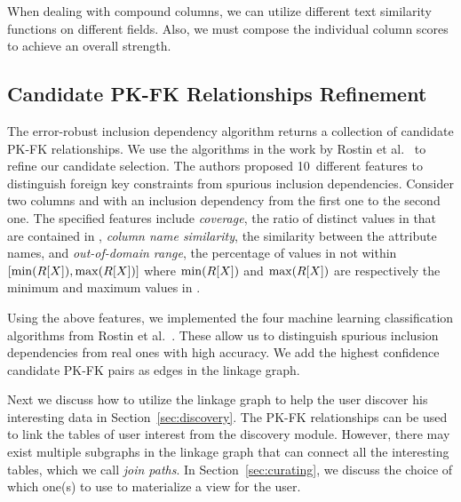 When dealing with compound columns, we can utilize different text similarity functions on different fields. 
Also, we must compose the individual column scores to achieve an overall strength.


\subsection{Candidate PK-FK Relationships Refinement}
\label{subsec:refine}


The error-robust inclusion dependency algorithm returns a collection of candidate PK-FK relationships.
We use the algorithms in the work by Rostin et al.~\cite{DBLP:conf/webdb/RostinABNL09} 
to refine our candidate selection. The authors proposed 10~different features to distinguish foreign key constraints from spurious inclusion dependencies. Consider two columns \RX and \SY with an inclusion dependency from the first one to the second one. 
The specified features include 
\emph{coverage}, the ratio of distinct values in \RX that are contained in \SY, 
\emph{column name similarity}, the similarity between the attribute names, 
and \emph{out-of-domain range}, the percentage of values in \SY not within $[\min(R[X]), \max(R[X])]$ where $\min(R[X])$ and $\max(R[X])$ are respectively the minimum and maximum values in \RX.

Using the above features, we implemented the four machine learning classification algorithms from Rostin et al.~\cite{DBLP:conf/webdb/RostinABNL09}. These allow us to distinguish spurious inclusion dependencies from real ones with high accuracy.   We add the highest confidence candidate PK-FK pairs as edges in the linkage graph.

Next we discuss how to utilize the linkage graph to help the user discover his interesting data in Section~\ref{sec:discovery}. The PK-FK relationships can be used to link the tables of user interest from the discovery module. However, there may exist multiple subgraphs in the linkage graph that can connect all the interesting tables, which we call \emph{join paths}. In Section~\ref{sec:curating}, we discuss the choice of which one(s) to use to materialize a view for the user.

